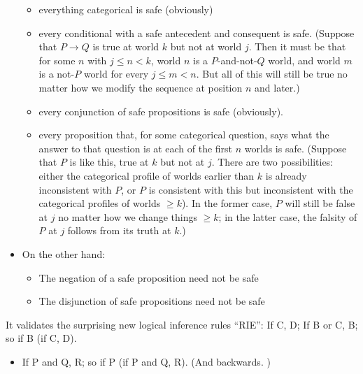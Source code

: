 \documentclass[If.tex]{subfiles}
\begin{document}
\begin{prop}
\begin{itemize}
    \begin{itemize}
        \item
      everything categorical is safe (obviously)
    \item
      every conditional with a safe antecedent and consequent is safe.
      (Suppose that $P→Q$ is true at world $k$ but not at world
      $j$. Then it must be that for some $n$ with $j≤n<k$, world
      $n$ is a $P$-and-not-$Q$ world, and world $m$ is a
      not-$P$ world for every $j≤m<n$. But all of this will still be
      true no matter how we modify the sequence at position $n$ and
      later.)
    \item
      every conjunction of safe propositions is safe (obviously).
    \item
      every proposition that, for some categorical question, says what
      the answer to that question is at each of the first $n$ worlds
      is safe. (Suppose that $P$ is like this, true at $k$ but not
      at $j$. There are two possibilities: either the categorical
      profile of worlds earlier than $k$ is already inconsistent with
      $P$, or $P$ is consistent with this but inconsistent with the
      categorical profiles of worlds $≥k$). In the former case, $P$
      will still be false at $j$ no matter how we change things
      $≥k$; in the latter case, the falsity of $P$ at $j$ follows
      from its truth at $k$.)
    \end{itemize}
  \item
    On the other hand:

    \begin{itemize}
        \item
      The negation of a safe proposition need not be safe
    \item
      The disjunction of safe propositions need not be safe
    \end{itemize}
  \end{itemize}
\item
  It validates the surprising new logical inference rules “RIE”: If C,
  D; If B or C, B; so if B (if C, D).\\
\end{prop}

\begin{itemize}
\item
  If P and Q, R; so if P (if P and Q, R). (And backwards. )
\end{itemize}
\end{document}
